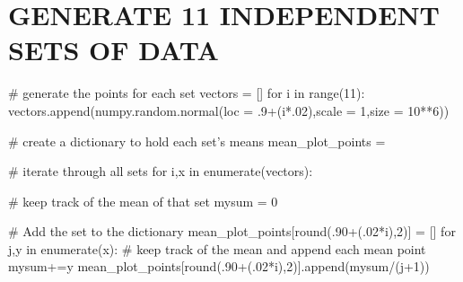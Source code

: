 \documentclass{article}
\begin{document}
\section{\MakeUppercase{Generate 11 Independent Sets of Data}}
\break
{}\break
{}\break
\begin{python}
	# generate the points for each set
    vectors = []
    for i in range(11):
        vectors.append(numpy.random.normal(loc = .9+(i*.02),scale = 1,size = 10**6))
\end{python}
\break
\begin{python}
	# create a dictionary to hold each set's means
    mean_plot_points = {}
    
    # iterate through all sets
    for i,x in enumerate(vectors):

        # keep track of the mean of that set
        mysum = 0

        # Add the set to the dictionary
        mean_plot_points[round(.90+(.02*i),2)] = []
        for j,y in enumerate(x):
            # keep track of the mean and append each mean point
            mysum+=y
            mean_plot_points[round(.90+(.02*i),2)].append(mysum/(j+1))
\end{python}
\pagebreak
{}\break
\end{document}
